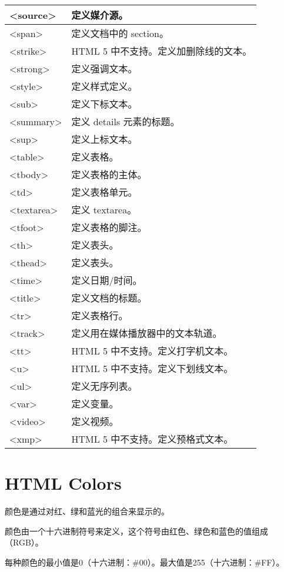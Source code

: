 \begin{longtable}{|p{80pt}|p{260pt}|}
\hline
<source>		&定义媒介源。\\
\hline
<span>		&定义文档中的 section。\\
\hline
<strike>		&HTML 5 中不支持。定义加删除线的文本。\\
\hline
<strong>		&定义强调文本。\\
\hline
<style>		&定义样式定义。\\
\hline
<sub>		&定义下标文本。\\
\hline
<summary>	&定义 details 元素的标题。\\
\hline
<sup>		&定义上标文本。\\
\hline
<table>		&定义表格。\\
\hline
<tbody>		&定义表格的主体。\\
\hline
<td>			&定义表格单元。\\
\hline
<textarea>	&定义 textarea。\\
\hline
<tfoot>		&定义表格的脚注。\\
\hline
<th>			&定义表头。\\
\hline
<thead>		&定义表头。\\
\hline
<time>		&定义日期/时间。\\
\hline
<title>		&定义文档的标题。\\
\hline
<tr>			&定义表格行。\\
\hline
<track>		&定义用在媒体播放器中的文本轨道。\\
\hline
<tt>			&HTML 5 中不支持。定义打字机文本。\\
\hline
<u>			&HTML 5 中不支持。定义下划线文本。\\
\hline
<ul>			&定义无序列表。\\
\hline
<var>		&定义变量。\\
\hline
<video>		&定义视频。\\
\hline
<xmp>		&HTML 5 中不支持。定义预格式文本。\\
\hline
\end{longtable}



\chapter{HTML Colors}




颜色是通过对红、绿和蓝光的组合来显示的。

颜色由一个十六进制符号来定义，这个符号由红色、绿色和蓝色的值组成（RGB）。

每种颜色的最小值是0（十六进制：\#00）。最大值是255（十六进制：\#FF）。

